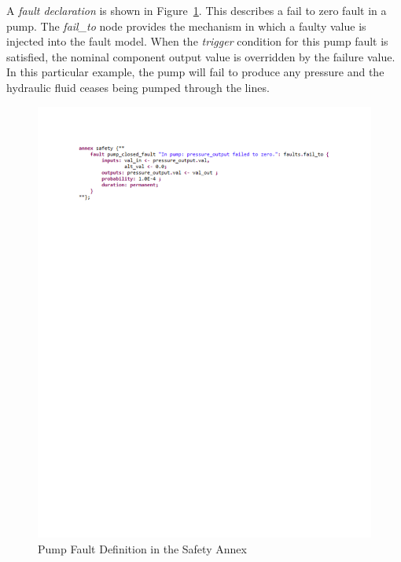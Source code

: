 A \textit{fault declaration} is shown in Figure~\ref{fig:fault_pump}. This describes a fail to zero fault in a pump. The \textit{fail\_to} node provides the mechanism in which a faulty value is injected into the fault model. When the \textit{trigger} condition for this pump fault is satisfied, the nominal component output value is overridden by the failure value. In this particular example, the pump will fail to produce any pressure and the hydraulic fluid ceases being pumped through the lines.  

\begin{figure}[h!]
	\vspace{-0.6in}
	\begin{center}
		\includegraphics[trim=30 635 0 30,clip,width=1.3\dimexpr\textwidth-1.5cm\relax]{images/pump_fault.pdf}
		\caption{Pump Fault Definition in the Safety Annex}
		\label{fig:fault_pump}
	\end{center}
\end{figure}

